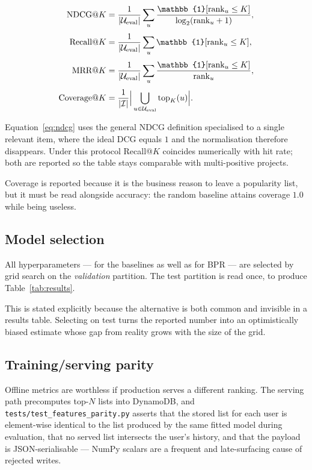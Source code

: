 \begin{align}
  \mathrm{NDCG@}K &= \frac{1}{|\Uset_{\text{eval}}|} \sum_{u}
    \frac{\mathbb{1}[\mathrm{rank}_u \leq K]}{\log_2(\mathrm{rank}_u + 1)} ,
    \label{eq:ndcg} \\[0.3em]
  \mathrm{Recall@}K &= \frac{1}{|\Uset_{\text{eval}}|} \sum_{u}
    \mathbb{1}[\mathrm{rank}_u \leq K] , \\[0.3em]
  \mathrm{MRR@}K &= \frac{1}{|\Uset_{\text{eval}}|} \sum_{u}
    \frac{\mathbb{1}[\mathrm{rank}_u \leq K]}{\mathrm{rank}_u} , \\[0.3em]
  \mathrm{Coverage@}K &= \frac{1}{|\Iset|}
    \Big\lvert \bigcup_{u \in \Uset_{\text{eval}}} \mathrm{top}_K(u) \Big\rvert .
\end{align}

Equation~\ref{eq:ndcg} uses the general NDCG definition specialised to a
single relevant item, where the ideal DCG equals $1$ and the normalisation
therefore disappears. Under this protocol Recall@$K$ coincides numerically
with hit rate; both are reported so the table stays comparable with
multi-positive projects.

Coverage is reported because it is the business reason to leave a popularity
list, but it must be read alongside accuracy: the random baseline attains
coverage $1.0$ while being useless.

\subsection{Model selection}

All hyperparameters --- for the baselines as well as for BPR --- are selected
by grid search on the \emph{validation} partition. The test partition is read
once, to produce Table~\ref{tab:results}.

This is stated explicitly because the alternative is both common and
invisible in a results table. Selecting on test turns the reported number
into an optimistically biased estimate whose gap from reality grows with the
size of the grid.

\subsection{Training/serving parity}

Offline metrics are worthless if production serves a different ranking. The
serving path precomputes top-$N$ lists into DynamoDB, and
\texttt{tests/test\_features\_parity.py} asserts that the stored list for each
user is element-wise identical to the list produced by the same fitted model
during evaluation, that no served list intersects the user's history, and
that the payload is JSON-serialisable --- NumPy scalars are a frequent and
late-surfacing cause of rejected writes.
